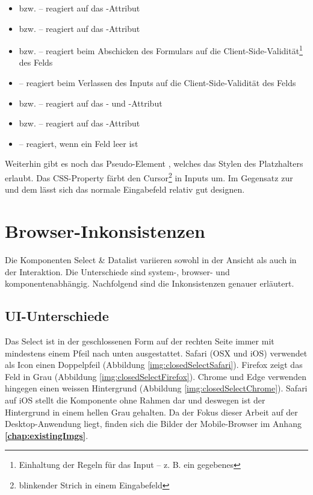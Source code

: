 \begin{itemize}
    \item {} bzw.  – reagiert auf das -Attribut
    \item {} bzw.  – reagiert auf das -Attribut
    \item {} bzw.  – reagiert beim Abschicken des Formulars auf die Client-Side-Validität\footnote{
            Einhaltung der Regeln für das Input – z. B. ein gegebenes 
        } des Felds
    \item {} – reagiert beim Verlassen des Inputs auf die Client-Side-Validität des Felds
    \item {} bzw.  – reagiert auf das - und -Attribut
    \item {} bzw.  – reagiert auf das -Attribut
    \item {} – reagiert, wenn ein Feld leer ist
\end{itemize}

Weiterhin gibt es noch das Pseudo-Element , welches das Stylen des Platzhalters erlaubt. 
Das CSS-Property  färbt den Cursor\footnote{
    blinkender Strich in einem Eingabefeld
} in Inputs um. 
Im Gegensatz zur  und dem  lässt sich das normale Eingabefeld relativ gut designen. 


\clearpage
\section{Browser-Inkonsistenzen}
\label{sec:browserInconsistency}

Die Komponenten Select \& Datalist variieren sowohl in der Ansicht als auch in der Interaktion. 
Die Unterschiede sind system-, browser- und komponentenabhängig.
Nachfolgend sind die Inkonsistenzen genauer erläutert. 


\subsection{UI-Unterschiede}
\label{sec:uiDifferences}

Das Select ist in der geschlossenen Form auf der rechten Seite immer mit mindestens einem Pfeil nach unten ausgestattet. 
Safari (OSX und iOS) verwendet als Icon einen Doppelpfeil (Abbildung \ref{img:closedSelectSafari}). 
Firefox zeigt das Feld in Grau (Abbildung \ref{img:closedSelectFirefox}). 
Chrome und Edge verwenden hingegen einen weissen Hintergrund (Abbildung \ref{img:closedSelectChrome}). 
Safari auf iOS stellt die Komponente ohne Rahmen dar und deswegen ist der Hintergrund in einem hellen Grau gehalten. 
Da der Fokus dieser Arbeit auf der Desktop-Anwendung liegt, finden sich die Bilder der Mobile-Browser im Anhang \textbf{\ref{chap:existingImgs}}. 

